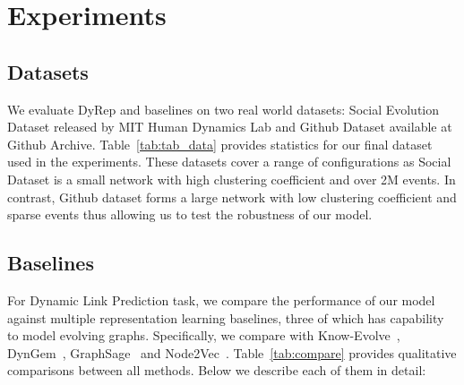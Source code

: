 \documentclass[11pt]{article}
\begin{document}
\vspace{-2mm}
\section{Experiments}
\vspace{-2mm}
\subsection{Datasets}
\vspace{-2mm}
We evaluate DyRep and baselines on two real world datasets: Social Evolution Dataset released by MIT Human Dynamics Lab and Github Dataset available at Github Archive. Table~\ref{tab:tab_data} provides statistics for our final dataset used in the experiments. These datasets cover a range of configurations as Social Dataset is a small network with high clustering coefficient and over 2M events. In contrast, Github dataset forms a large network with low clustering coefficient and sparse events thus allowing us to test the robustness of our model.

\begin{table}[h!]
\label{tab_data}
\caption{Dataset Statistics for Social Evolution and Github.}
\label{tab:tab_data}
\end{table}


\subsection{Baselines}
For Dynamic Link Prediction task, we compare the performance of our model against multiple representation learning  baselines, three of which has capability to model evolving graphs. Specifically, we compare with Know-Evolve~\cite{TriDaiWanSon17}, DynGem~\cite{GoyKamHeLiu17}, GraphSage~\cite{HamYinLes17} and Node2Vec~\cite{GroLes16}. Table~\ref{tab:compare} provides qualitative comparisons between all methods. Below we describe each of them in detail:
\end{document}
